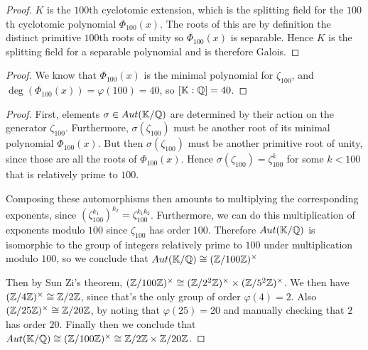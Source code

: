 \documentclass[11pt]{article}
\begin{document}
\begin{proof}
  $K$ is the $100$th cyclotomic extension, which is the splitting field for the $100$th cyclotomic polynomial $\Phi_{100}(x)$.
  The roots of this are by definition the distinct primitive $100$th roots of unity so $\Phi_{100}(x)$ is separable.
  Hence $K$ is the splitting field for a separable polynomial and is therefore Galois.
\end{proof}

\begin{proof}
  We know that $\Phi_{100}(x)$ is the minimal polynomial for $\zeta_{100}$, and $\deg(\Phi_{100}(x)) = \varphi(100) = 40$, so $[\mathbb{K}:\mathbb{Q}] = 40$.
\end{proof}

\begin{proof}
  First, elements $\sigma \in Aut(\mathbb{K}/\mathbb{Q})$ are determined by their action on the generator $\zeta_{100}$.
  Furthermore, $\sigma(\zeta_{100})$ must be another root of its minimal polynomial $\Phi_{100}(x)$.
  But then $\sigma(\zeta_{100})$ must be another primitive root of unity, since those are all the roots of $\Phi_{100}(x)$.
  Hence $\sigma(\zeta_{100}) = \zeta_{100}^k$ for some $k < 100$ that is relatively prime to $100$.

  Composing these automorphisms then amounts to multiplying the corresponding exponents, since $(\zeta_{100}^{k_1})^{k_2} = \zeta_{100}^{k_1k_2}$.
  Furthermore, we can do this multiplication of exponents modulo $100$ since $\zeta_{100}$ has order $100$.
  Therefore $Aut(\mathbb{K}/\mathbb{Q})$ is isomorphic to the group of integers relatively prime to $100$ under multiplication modulo $100$,
  so we conclude that $Aut(\mathbb{K}/\mathbb{Q}) \cong (\mathbb{Z}/100\mathbb{Z})^\times$

  Then by Sun Zi's theorem, $(\mathbb{Z}/100\mathbb{Z})^\times \cong (\mathbb{Z}/2^2\mathbb{Z})^\times \times (\mathbb{Z}/5^2\mathbb{Z})^\times$.
  We then have $(\mathbb{Z}/4\mathbb{Z})^\times \cong \mathbb{Z}/2\mathbb{Z}$, since that's the only group of order $\varphi(4) = 2$.
  Also $(\mathbb{Z}/25\mathbb{Z})^\times \cong \mathbb{Z}/20\mathbb{Z}$, by noting that $\varphi(25) = 20$ and manually checking that $2$ has order $20$.
  Finally then we conclude that $Aut(\mathbb{K}/\mathbb{Q}) \cong (\mathbb{Z}/100\mathbb{Z})^\times \cong \mathbb{Z}/2\mathbb{Z} \times \mathbb{Z}/20\mathbb{Z}$.
\end{proof}
\end{document}
